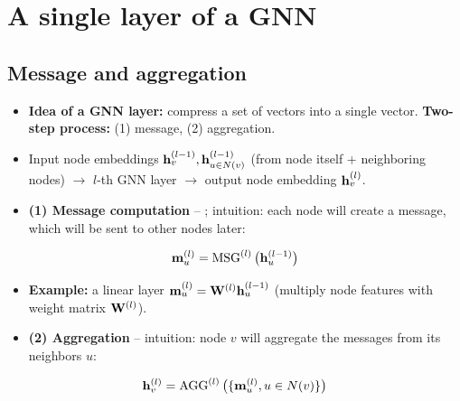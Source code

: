 \section{A single layer of a GNN}\label{sec:lec04-layer}

\subsection{Message and aggregation}\label{sec:lec04-msgagg}

\begin{itemize}
  \item \textbf{Idea of a GNN layer:} compress a set of vectors into a single
    vector. \textbf{Two-step process:} (1) message, (2) aggregation.
  \item Input node embeddings $\mathbf{h}_v^{(l-1)}, \mathbf{h}_{u\in N(v)}^{(l-1)}$ (from node
    itself + neighboring nodes) $\to$ $l$-th GNN layer $\to$ output node
    embedding $\mathbf{h}_v^{(l)}$.
  \item \textbf{(1) Message computation} -- ; intuition:
    each node will create a message, which will be sent to other nodes later:
\end{itemize}
\begin{equation}\label{eq:lec04-msg}
  \mathbf{m}_u^{(l)} = \operatorname{MSG}^{(l)}\big(\mathbf{h}_u^{(l-1)}\big)
\end{equation}
\begin{itemize}
  \item[] \textbf{Example:} a linear layer $\mathbf{m}_u^{(l)}=\mathbf{W}^{(l)}\mathbf{h}_u^{(l-1)}$
    (multiply node features with weight matrix $\mathbf{W}^{(l)}$).
  \item \textbf{(2) Aggregation} -- intuition: node $v$ will aggregate the
    messages from its neighbors $u$:
\end{itemize}
\begin{equation}\label{eq:lec04-agg}
  \mathbf{h}_v^{(l)} = \operatorname{AGG}^{(l)}\big(\{\mathbf{m}_u^{(l)}, u\in N(v)\}\big)
\end{equation}
